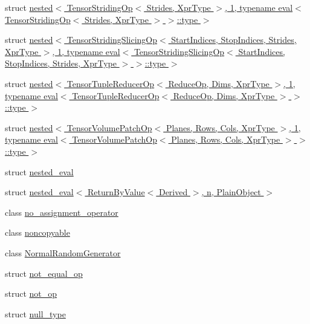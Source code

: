 \begin{DoxyCompactItemize}
\item 
struct \hyperlink{struct_eigen_1_1internal_1_1nested_3_01_tensor_striding_op_3_01_strides_00_01_xpr_type_01_4_00_02d594d957e3c480f253fbd76dacb178f}{nested$<$ Tensor\+Striding\+Op$<$ Strides, Xpr\+Type $>$, 1, typename eval$<$ Tensor\+Striding\+Op$<$ Strides, Xpr\+Type $>$ $>$\+::type $>$}
\item 
struct \hyperlink{struct_eigen_1_1internal_1_1nested_3_01_tensor_striding_slicing_op_3_01_start_indices_00_01_stopc629a6763d7f6c225084b7a41b6d4822}{nested$<$ Tensor\+Striding\+Slicing\+Op$<$ Start\+Indices, Stop\+Indices, Strides, Xpr\+Type $>$, 1, typename eval$<$ Tensor\+Striding\+Slicing\+Op$<$ Start\+Indices, Stop\+Indices, Strides, Xpr\+Type $>$ $>$\+::type $>$}
\item 
struct \hyperlink{struct_eigen_1_1internal_1_1nested_3_01_tensor_tuple_reducer_op_3_01_reduce_op_00_01_dims_00_01_821bbc2beef8f62325eb5ce9ac37fcf5}{nested$<$ Tensor\+Tuple\+Reducer\+Op$<$ Reduce\+Op, Dims, Xpr\+Type $>$, 1, typename eval$<$ Tensor\+Tuple\+Reducer\+Op$<$ Reduce\+Op, Dims, Xpr\+Type $>$ $>$\+::type $>$}
\item 
struct \hyperlink{struct_eigen_1_1internal_1_1nested_3_01_tensor_volume_patch_op_3_01_planes_00_01_rows_00_01_cols82921df878abaf81e0e304ae8f39bd52}{nested$<$ Tensor\+Volume\+Patch\+Op$<$ Planes, Rows, Cols, Xpr\+Type $>$, 1, typename eval$<$ Tensor\+Volume\+Patch\+Op$<$ Planes, Rows, Cols, Xpr\+Type $>$ $>$\+::type $>$}
\item 
struct \hyperlink{struct_eigen_1_1internal_1_1nested__eval}{nested\+\_\+eval}
\item 
struct \hyperlink{struct_eigen_1_1internal_1_1nested__eval_3_01_return_by_value_3_01_derived_01_4_00_01n_00_01_plain_object_01_4}{nested\+\_\+eval$<$ Return\+By\+Value$<$ Derived $>$, n, Plain\+Object $>$}
\item 
class \hyperlink{class_eigen_1_1internal_1_1no__assignment__operator}{no\+\_\+assignment\+\_\+operator}
\item 
class \hyperlink{class_eigen_1_1internal_1_1noncopyable}{noncopyable}
\item 
class \hyperlink{class_eigen_1_1internal_1_1_normal_random_generator}{Normal\+Random\+Generator}
\item 
struct \hyperlink{struct_eigen_1_1internal_1_1not__equal__op}{not\+\_\+equal\+\_\+op}
\item 
struct \hyperlink{struct_eigen_1_1internal_1_1not__op}{not\+\_\+op}
\item 
struct \hyperlink{struct_eigen_1_1internal_1_1null__type}{null\+\_\+type}

\end{DoxyCompactItemize}
